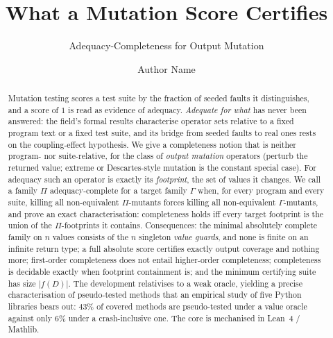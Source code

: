 \documentclass[runningheads,envcountsect,envcountsame]{llncs}
\begin{document}
\title{What a Mutation Score Certifies}
\subtitle{Adequacy-Completeness for Output Mutation}

\author{Author Name}

\maketitle

\begin{abstract}
Mutation testing scores a test suite by the fraction of seeded faults it
distinguishes, and a score of $1$ is read as evidence of adequacy. \emph{Adequate
for what} has never been answered: the field's formal results characterise
operator sets relative to a fixed program text or a fixed test suite, and its
bridge from seeded faults to real ones rests on the coupling-effect hypothesis.
We give a completeness notion that is neither program- nor suite-relative, for
the class of \emph{output mutation} operators (perturb the returned value;
extreme or Descartes-style mutation is the constant special case). For adequacy
such an operator is exactly its \emph{footprint}, the set of values it changes.
We call a family $\Pi$ adequacy-complete for a target family $\Gamma$ when, for
every program and every suite, killing all non-equivalent $\Pi$-mutants forces
killing all non-equivalent $\Gamma$-mutants, and prove an exact
characterisation: completeness holds iff every target footprint is the union of
the $\Pi$-footprints it contains. Consequences: the minimal absolutely complete
family on $n$ values consists of the $n$ singleton \emph{value guards}, and none
is finite on an infinite return type; a full absolute score certifies exactly
output coverage and nothing more; first-order completeness does not entail
higher-order completeness; completeness is decidable exactly when footprint
containment is; and the minimum certifying suite has size $|f(D)|$. The
development relativises to a weak oracle, yielding a precise characterisation of
pseudo-tested methods that an empirical study of five Python libraries bears out:
$43\%$ of covered methods are pseudo-tested under a value oracle against only
$6\%$ under a crash-inclusive one. The core is mechanised in Lean~4 / Mathlib.

\end{abstract}
\end{document}
